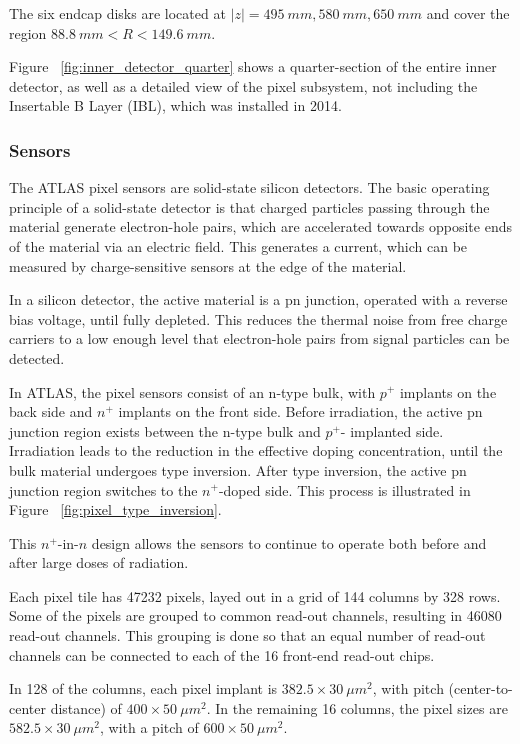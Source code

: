 The six endcap disks are located at $|z| = 495~mm, 580~mm, 650~mm$
and cover the region $88.8~mm < R < 149.6~mm$. \cite{atlas-detector-2008}

Figure ~\ref{fig:inner_detector_quarter} shows a quarter-section of
the entire inner detector, as well as a detailed view of the pixel
subsystem, not including the Insertable B Layer (IBL), which was
installed in 2014.

\subsubsection{Sensors}
The ATLAS pixel sensors are solid-state silicon detectors. The basic operating
principle of a solid-state detector is that charged particles passing
through the material generate electron-hole pairs, which are
accelerated towards opposite ends of the material via an electric
field. This generates a current, which can be measured by
charge-sensitive sensors at the edge of the material.\cite{spieler-2005}

In a silicon detector, the active material is a pn junction, operated
with a reverse bias voltage, until fully depleted. This reduces the thermal noise
from free charge carriers to a low enough level that electron-hole pairs from
signal particles can be detected.\cite{spieler-2005}

In ATLAS, the pixel sensors consist of an n-type bulk, with $p^+$
implants on the back side and $n^+$ implants on the front side. Before
irradiation, the active pn junction region exists between the n-type bulk and $p^+$-
implanted side. Irradiation leads to the reduction in the effective
doping concentration, until the bulk material undergoes type
inversion. After type inversion, the active pn junction region
switches to the $n^+$-doped side.\cite{pixels-2008} This process is illustrated in
Figure ~\ref{fig:pixel_type_inversion}.

This $n^+$-in-$n$ design allows the sensors to continue to operate
both before and after large doses of radiation.

Each pixel tile has 47232 pixels, layed out in a grid of 144 columns
by 328 rows. Some of the pixels are grouped to common read-out
channels, resulting in 46080 read-out channels. This grouping is done
so that an equal number of read-out channels can be connected to each
of the 16 front-end read-out chips.

In 128 of the columns, each pixel implant is $382.5\times30~\mu m^2$,
with pitch (center-to-center distance) of  $400\times50~\mu m^2$. In
the remaining 16 columns, the pixel sizes are $582.5\times30~\mu m^2$,
with a pitch of  $600\times50~\mu m^2$.\cite{pixels-2008}

